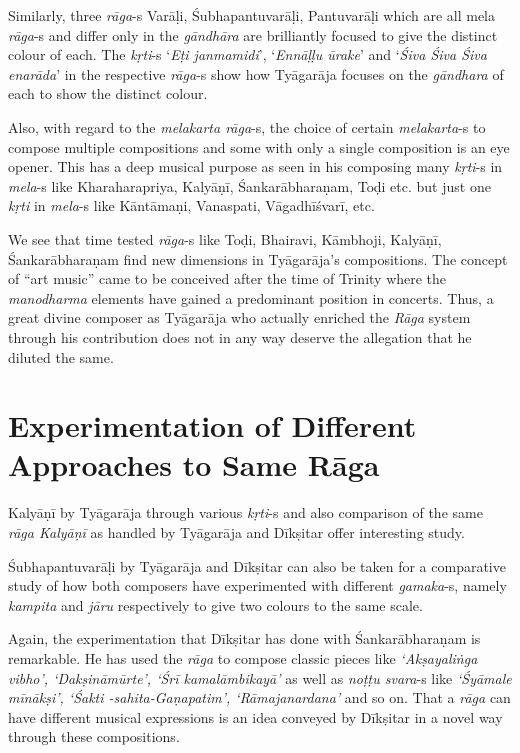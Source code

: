 Similarly, three \textit{rāga}-s Varāḷi, Śubhapantuvarāḷi, Pantuvarāḷi which are all mela \textit{rāga}-s and differ only in the \textit{gāndhāra} are brilliantly focused to give the distinct colour of each. The \textit{kṛti}-s ‘\textit{Eṭi janmamidi}’, ‘\textit{Ennāḷḷu ūrake}’ and ‘\textit{Śiva Śiva Śiva enarāda}’ in the respective \textit{rāga}-s show how Tyāgarāja focuses on the \textit{gāndhara} of each to show the distinct colour.

Also, with regard to the \textit{melakarta rāga}-s, the choice of certain \textit{melakarta}-s to compose multiple compositions and some with only a single composition is an eye opener. This has a deep musical purpose as seen in his composing many \textit{kṛti}-s in \textit{mela}-s like Kharaharapriya, Kalyāṇī, Śankarābharaṇam, Toḍi etc. but just one \textit{kṛti} in \textit{mela}-s like Kāntāmaṇi, Vanaspati, Vāgadhīśvarī, etc.

We see that time tested \textit{rāga}-s like Toḍi, Bhairavi, Kāmbhoji, Kalyāṇī, Śankarābharaṇam find new dimensions in Tyāgarāja’s compositions. The concept of “art music” came to be conceived after the time of Trinity where the \textit{manodharma} elements have gained a predominant position in concerts. Thus, a great divine composer as Tyāgarāja who actually enriched the \textit{Rāga} system through his contribution does not in any way deserve the allegation that he diluted the same.


\section*{Experimentation of Different Approaches to Same Rāga}

Kalyāṇī by Tyāgarāja through various \textit{kṛti}-s and also comparison of the same \textit{rāga Kalyāṇī} as handled by Tyāgarāja and Dīkṣitar offer interesting study.

Śubhapantuvarāḷi by Tyāgarāja and Dīkṣitar can also be taken for a comparative study of how both composers have experimented with different \textit{gamaka}-s, namely \textit{kampita} and \textit{jāru} respectively to give two colours to the same scale.

Again, the experimentation that Dīkṣitar has done with Śankarābhara\-ṇam is remarkable. He has used the \textit{rāga} to compose classic pieces like \textit{‘Akṣayaliṅga vibho’, ‘Dakṣināmūrte’, ‘Śrī kamalāmbikayā’} as well as \textit{noṭṭu svara}-s like \textit{‘Śyāmale mīnākṣi’, ‘Śakti -sahita-Gaṇapatim’, ‘Rāmajanardana’} and so on. That a \textit{rāga} can have different musical expressions is an idea conveyed by Dīkṣitar in a novel way through these compositions.

